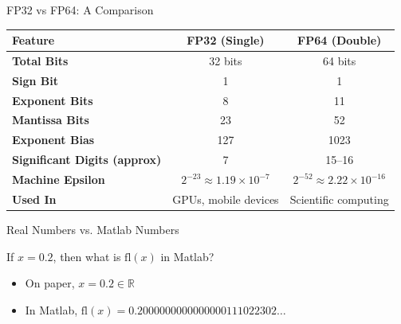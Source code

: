 \documentclass[10pt]{beamer}
\begin{document}
\begin{frame}{FP32 vs FP64: A Comparison}

\begin{center}
\begin{tabular}{|l|c|c|}
\hline
\textbf{Feature} & \textbf{FP32 (Single)} & \textbf{FP64 (Double)} \\
\hline
\textbf{Total Bits}         & 32 bits            & 64 bits \\
\textbf{Sign Bit}           & 1                  & 1 \\
\textbf{Exponent Bits}      & 8                  & 11 \\
\textbf{Mantissa Bits}      & 23                 & 52 \\
\textbf{Exponent Bias}      & 127                & 1023 \\
\textbf{Significant Digits (approx)} & 7           & 15–16 \\
\textbf{Machine Epsilon}    & $2^{-23} \approx 1.19\times10^{-7}$ & $2^{-52} \approx 2.22\times10^{-16}$ \\
\textbf{Used In}            & GPUs, mobile devices & Scientific computing \\
\hline
\end{tabular}
\end{center}

\vspace{2mm}

\end{frame}

\begin{frame}[fragile]{Real Numbers vs. Matlab Numbers}

\begin{example}
    If $x = 0.2$, then what is $\mathrm{fl}(x)$ in Matlab? 
\end{example}
\begin{itemize}
    \begin{lstlisting}
>> fprintf('%.25f',0.2)
0.2000000000000000111022302
\end{lstlisting}
    \item On paper, $x=0.2\in\mathbb{R}$
    \item In Matlab, $\mathrm{fl}(x)=0.2000000000000000111022302\ldots$
\end{itemize}
\end{frame}
\end{document}
